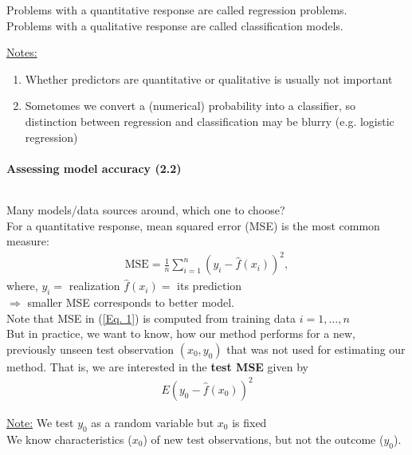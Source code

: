 \documentclass[11pt,a4paper,numbers=endperiod]{scrartcl}
\newcommand{\id}{\hspace*{4mm}}
\newcommand{\tit}[1]{\begin{large} \underline{\text{#1}}\end{large}}
\begin{document}
Problems with a quantitative response are called regression problems.\\
Problems with a qualitative response are called classification models.

\underline{Notes:} \begin{enumerate}
	\item Whether predictors are quantitative or qualitative is usually not important
	\item Sometomes we convert a (numerical) probability into a classifier, so distinction between regression and classification may be blurry (e.g. logistic regression)
\end{enumerate}

\paragraph{Assessing model accuracy (2.2)}
$ $\\

\tit{Question:} Many models/data sources around, which one to choose?\\

For a quantitative response, mean squared error (MSE) is the most common measure: \begin{align}
	\text{MSE} = \frac{1}{n} \sum\limits_{i = 1}^n (y_i - \hat{f}(x_i))^2, \label{Eq. 1}
\end{align}
where, $y_i =$ realization $\hat{f}(x_i) =$ its prediction\\
$\Rightarrow$ smaller MSE corresponds to better model.\\
Note that MSE in (\ref*{Eq. 1}) is computed from training data $i = 1, \ldots, n$\\
But in practice, we want to know, how our method performs for a new, previously unseen test observation $(x_0, y_0)$ that was not used for estimating our method. That is, we are interested in the \textbf{test MSE} given by \begin{align}
	E(y_0 - \hat{f}(x_0))^2 \label{Eq. 2}
\end{align}

\underline{Note:} We test $y_0$ as a random variable but $x_0$ is fixed\\
\id {} We know characteristics ($x_0$) of new test observations, but not the outcome ($y_0$). \\ 
\end{document}
